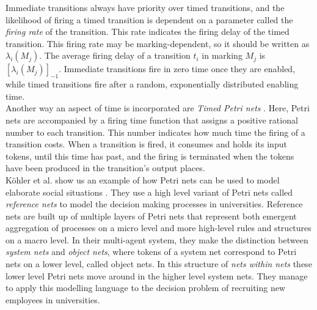 \documentclass[11pt, a4paper]{book}
\begin{document}
Immediate transitions always have priority over timed transitions, and  the likelihood of firing a timed transition is dependent on a parameter called the \emph{firing rate} of the transition. This rate indicates the firing delay of the timed transition. This firing rate may be marking-dependent, so it should be written as $\lambda_i(M_j)$.  The average firing delay of a transition $t_i$ in marking $M_j$ is $[\lambda_i(M_j)]_{-1}$. Immediate transitions fire in zero time once they are enabled, while timed transitions fire after a random, exponentially distributed enabling time.\\
Another way an aspect of time is incorporated are \emph{Timed Petri nets} \cite{zuberek1980timed}. Here, Petri nets are accompanied by a firing time function that assigns a positive rational number to each transition. This number indicates how much time the firing of a transition costs. When a transition is fired, it consumes and holds its input tokens, until this time has past, and the firing is terminated when the tokens have been produced in the transition's output places.\\
K\"{o}hler et al. show us an example of how Petri nets can be used to model elaborate social situations \cite{Köhler03modellingsocial}. They use a high level variant of Petri nets called \emph{reference nets} to model the decision making processes in universities. Reference nets are built up of multiple layers of Petri nets that represent both emergent aggregation of processes on a micro level and more high-level rules and structures on a macro level. In their multi-agent system, they make the distinction between \emph{system nets} and \emph{object nets}, where tokens of a system net correspond to Petri nets on a lower level, called object nets. In this structure of \emph{nets within nets} these lower level Petri nets move around in the higher level system nets. They manage to apply this modelling language to the decision problem of recruiting new employees in universities.
\end{document}
